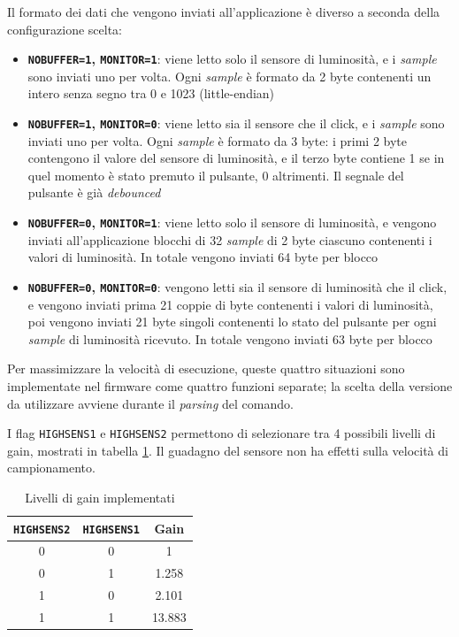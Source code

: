 Il formato dei dati che vengono inviati all'applicazione è diverso a seconda della configurazione scelta:
\begin{itemize}
	\item \textbf{\texttt{NOBUFFER=1}, \texttt{MONITOR=1}}: viene letto solo il sensore di luminosità, e i \textit{sample} sono inviati uno per volta. Ogni \textit{sample} è formato da 2 byte contenenti un intero senza segno tra 0 e 1023 (little-endian)
	\item \textbf{\texttt{NOBUFFER=1}, \texttt{MONITOR=0}}: viene letto sia il sensore che il click, e i \textit{sample} sono inviati uno per volta. Ogni \textit{sample} è formato da 3 byte: i primi 2 byte contengono il valore del sensore di luminosità, e il terzo byte contiene 1 se in quel momento è stato premuto il pulsante, 0 altrimenti. Il segnale del pulsante è già \textit{debounced}
	\item \textbf{\texttt{NOBUFFER=0}, \texttt{MONITOR=1}}: viene letto solo il sensore di luminosità, e vengono inviati all'applicazione blocchi di 32 \textit{sample} di 2 byte ciascuno contenenti i valori di luminosità. In totale vengono inviati 64 byte per blocco
	\item \textbf{\texttt{NOBUFFER=0}, \texttt{MONITOR=0}}: vengono letti sia il sensore di luminosità che il click, e vengono inviati prima 21 coppie di byte contenenti i valori di luminosità, poi vengono inviati 21 byte singoli contenenti lo stato del pulsante per ogni \textit{sample} di luminosità ricevuto. In totale vengono inviati 63 byte per blocco
\end{itemize}

Per massimizzare la velocità di esecuzione, queste quattro situazioni sono implementate nel firmware come quattro funzioni separate; la scelta della versione da utilizzare avviene durante il \textit{parsing} del comando.

I flag \texttt{HIGHSENS1} e \texttt{HIGHSENS2} permettono di selezionare tra 4 possibili livelli di gain, mostrati in tabella \ref{tab:openldat_gains}. Il guadagno del sensore non ha effetti sulla velocità di campionamento.
\begin{table}[h!]
	\centering
	\begin{tabular}{|c|c|c|} 
		\hline
		\texttt{HIGHSENS2} & \texttt{HIGHSENS1} & \textbf{Gain}  \\ 
		\hline
		0 & 0 & 1         \\ 
		\hline
		0 & 1 & 1.258         \\ 
		\hline
		1 & 0 & 2.101         \\ 
		\hline
		1 & 1 & 13.883         \\ 
		\hline
	\end{tabular}
	\caption{\label{tab:openldat_gains}Livelli di gain implementati}
\end{table}

